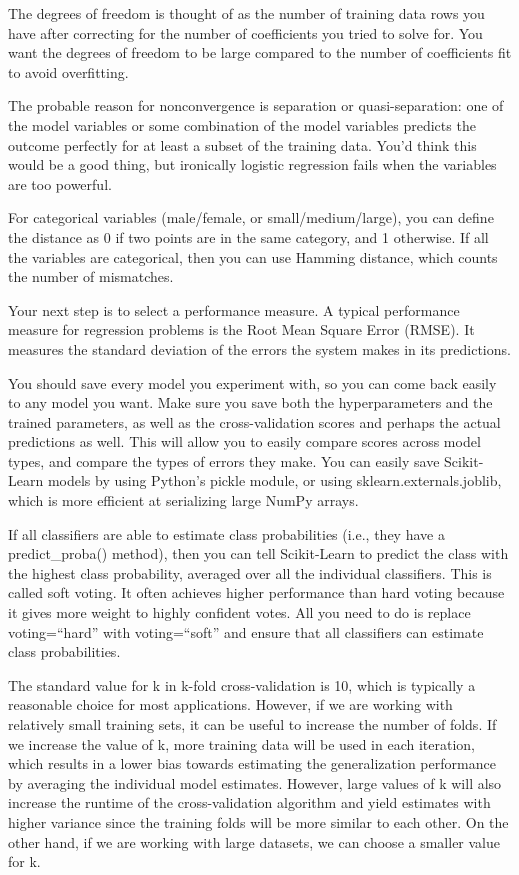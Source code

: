 \documentclass[]{book}
\begin{document}
The degrees of freedom is thought of as the number of training data rows you have after correcting for the number of coefficients you tried to solve for. You want the degrees of freedom to be large compared to the number of coefficients fit to avoid overfitting.

The probable reason for nonconvergence is separation or quasi-separation: one of the model variables or some combination of the model variables predicts the outcome perfectly for at least a subset of the training data. You'd think this would be a good thing, but ironically logistic regression fails when the variables are too powerful.

For categorical variables (male/female, or small/medium/large), you can define the distance as 0 if two points are in the same category, and 1 otherwise. If all the variables are categorical, then you can use Hamming distance, which counts the number of mismatches.

Your next step is to select a performance measure. A typical performance measure for regression problems is the Root Mean Square Error (RMSE). It measures the standard deviation of the errors the system makes in its predictions.

You should save every model you experiment with, so you can come back easily to any model you want. Make sure you save both the hyperparameters and the trained parameters, as well as the cross-validation scores and perhaps the actual predictions as well. This will allow you to easily compare scores across model types, and compare the types of errors they make. You can easily save Scikit-Learn models by using Python's pickle module, or using sklearn.externals.joblib, which is more efficient at serializing large NumPy arrays.

If all classifiers are able to estimate class probabilities (i.e., they have a predict\_proba() method), then you can tell Scikit-Learn to predict the class with the highest class probability, averaged over all the individual classifiers. This is called soft voting. It often achieves higher performance than hard voting because it gives more weight to highly confident votes. All you need to do is replace voting=``hard'' with voting=``soft'' and ensure that all classifiers can estimate class probabilities.

The standard value for k in k-fold cross-validation is 10, which is typically a reasonable choice for most applications. However, if we are working with relatively small training sets, it can be useful to increase the number of folds. If we increase the value of k, more training data will be used in each iteration, which results in a lower bias towards estimating the generalization performance by averaging the individual model estimates. However, large values of k will also increase the runtime of the cross-validation algorithm and yield estimates with higher variance since the training folds will be more similar to each other. On the other hand, if we are working with large datasets, we can choose a smaller value for k.
\end{document}
